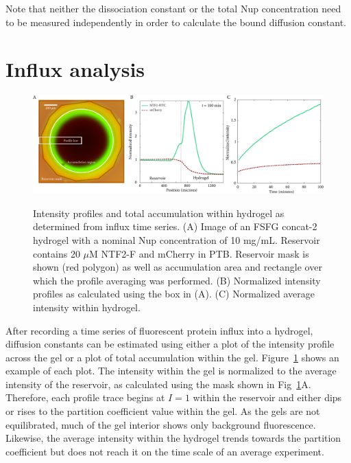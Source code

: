 Note that neither the dissociation constant or the total Nup concentration need to be measured independently in order to calculate the bound diffusion constant.

\section{Influx analysis}
\label{sec:influx-analysis}

\begin{figure}
\caption[Intensity profiles and accumulation curve from influx experiments.]{Intensity profiles and total accumulation within hydrogel as determined from influx time series.  (A) Image of an FSFG concat-2 hydrogel with a nominal Nup concentration of 10 mg/mL. Reservoir contains 20 $\mu$M NTF2-F and mCherry in PTB. Reservoir mask is shown (red polygon) as well as accumulation area and rectangle over which the profile averaging was performed. (B) Normalized intensity profiles as calculated using the box in (A).  (C) Normalized average intensity within hydrogel.}
\centering
\includegraphics[width=\textwidth]{figs/ch04/influx-plots.pdf}
\label{fig:influx-plots}
\end{figure}

After recording a time series of fluorescent protein influx into a hydrogel, diffusion constants can be estimated using either a plot of the intensity profile across the gel or a plot of total accumulation within the gel.  Figure~\ref{fig:influx-plots} shows an example of each plot.  The intensity within the gel is normalized to the average intensity of the reservoir, as calculated using the mask shown in Fig~\ref{fig:influx-plots}A.  Therefore, each profile trace begins at $I=1$ within the reservoir and either dips or rises to the partition coefficient value within the gel.  As the gels are not equilibrated, much of the gel interior shows only background fluorescence.  Likewise, the average intensity within the hydrogel trends towards the partition coefficient but does not reach it on the time scale of an average experiment.

